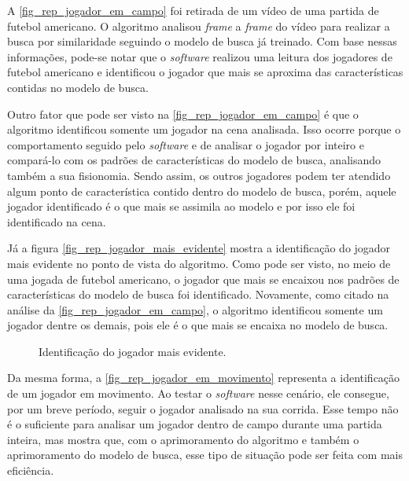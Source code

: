 A \autoref{fig_rep_jogador_em_campo} foi retirada de um vídeo de uma partida de futebol americano. O algoritmo analisou \textit{frame} a \textit{frame} do vídeo para realizar a busca por similaridade seguindo o modelo de busca já treinado. Com base nessas informações, pode-se notar que o \textit{software} realizou uma leitura dos jogadores de futebol americano e identificou o jogador que mais se aproxima das características contidas no modelo de busca.

Outro fator que pode ser visto na \autoref{fig_rep_jogador_em_campo} é que o algoritmo identificou somente um jogador na cena analisada. Isso ocorre porque o comportamento seguido pelo \textit{software} e de analisar o jogador por inteiro e compará-lo com os padrões de características do modelo de busca, analisando também a sua fisionomia. Sendo assim, os outros jogadores podem ter atendido algum ponto de característica contido dentro do modelo de busca, porém, aquele jogador identificado é o que mais se assimila ao modelo e por isso ele foi identificado na cena.

Já a figura \autoref{fig_rep_jogador_mais_evidente} mostra a identificação do jogador mais evidente no ponto de vista do algoritmo. Como pode ser visto, no meio de uma jogada de futebol americano, o jogador que mais se encaixou nos padrões de características do modelo de busca foi identificado. Novamente, como citado na análise da \autoref{fig_rep_jogador_em_campo}, o algoritmo identificou somente um jogador dentre os demais, pois ele é o que mais se encaixa no modelo de busca.

\begin{figure}[ht]
	\caption{\label{fig_rep_jogador_mais_evidente}Identificação do jogador mais evidente.}
	\begin{center}
	\end{center}
	\centering {}
\end{figure}

Da mesma forma, a \autoref{fig_rep_jogador_em_movimento} representa a identificação de um jogador em movimento. Ao testar o \textit{software} nesse cenário, ele consegue, por um breve período, seguir o jogador analisado na sua corrida. Esse tempo não é o suficiente para analisar um jogador dentro de campo durante uma partida inteira, mas mostra que, com o aprimoramento do algoritmo e também o aprimoramento do modelo de busca, esse tipo de situação pode ser feita com mais eficiência.


